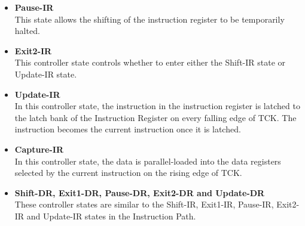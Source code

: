 \documentclass[a4paper,11pt]{article}
\begin{document}
\begin{itemize}[noitemsep]
\item \textbf{Pause-IR} \\This state allows the shifting of the instruction register to be temporarily halted.
\item \textbf{Exit2-IR} \\This controller state controls whether to enter either the Shift-IR state or Update-IR state.
\item \textbf{Update-IR} \\In this controller state, the instruction in the instruction register is latched to the latch bank of the Instruction Register on every falling edge of TCK. The instruction becomes the current instruction once it is latched.
\item \textbf{Capture-IR} \\In this controller state, the data is parallel-loaded into the data registers selected by the current instruction on the rising edge of TCK.
\item \textbf{Shift-DR, Exit1-DR, Pause-DR, Exit2-DR and Update-DR} \\These controller states are similar to the Shift-IR, Exit1-IR, Pause-IR, Exit2-IR and Update-IR states in the Instruction Path.
\end{itemize}
\end{document}
